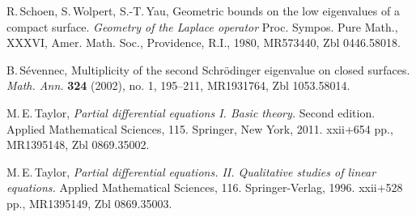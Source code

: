\documentclass[a4paper,11pt]{amsart}
\numberwithin{equation}{section}
\theoremstyle{definition}
\begin{document}
\begin{thebibliography}{HMZ2}
R.\,Schoen,  S.\,Wolpert, S.-T.\,Yau,
Geometric bounds on the low eigenvalues of a compact surface.
\emph{Geometry of the Laplace operator}
Proc. Sympos. Pure Math., XXXVI, Amer. Math. Soc., Providence, R.I., 1980,
MR573440, Zbl 0446.58018. 

B.\,S\'evennec,
Multiplicity of the second Schr\"odinger eigenvalue on closed surfaces.
\emph{Math. Ann.} {\bf 324} (2002), no. 1, 195--211,
MR1931764, Zbl 1053.58014.

M.\,E.\,Taylor,
\emph{Partial differential equations I. Basic theory.}
Second edition. Applied Mathematical Sciences, 115. Springer, New York, 2011. xxii+654 pp.,
MR1395148, Zbl 0869.35002.

M.\,E.\,Taylor,
\emph{Partial differential equations. II. Qualitative studies of linear equations.}
Applied Mathematical Sciences, 116. Springer-Verlag, 1996. xxii+528 pp.,
MR1395149, Zbl 0869.35003.

\end{thebibliography}
\end{document}
